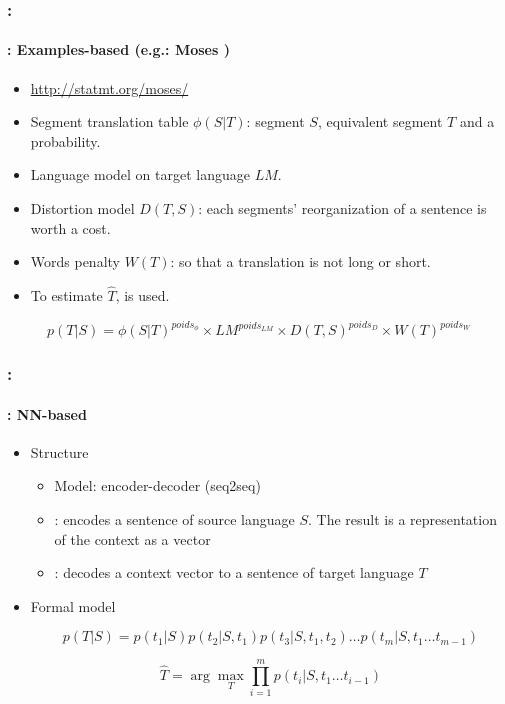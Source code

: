 \documentclass[xcolor=table]{beamer}
\begin{document}
\begin{frame}
	\frametitle{\insertshortsubtitle: \insertsection}
	\framesubtitle{\insertsubsection: Examples-based (e.g.: Moses \cite{07-koehn-al})}
	
	\begin{itemize}
		\item \url{http://statmt.org/moses/}
		\item Segment translation table $\phi(S|T)$: segment $S$, equivalent segment $T$ and a probability.
		\item Language model on target language $LM$.
		\item Distortion model $ D(T, S) $: each segments' reorganization of a sentence is worth a cost.
		\item Words penalty $W(T)$: so that a translation is not long or short.
		\item To estimate $\hat{T}$,  is used.
	\end{itemize}

	\[p(T|S) = \phi(S|T)^{poids_{\phi}} \times LM^{poids_{LM}} \times D(T, S)^{poids_{D}} \times W(T)^{poids_{W}}\]
	
\end{frame}

\begin{frame}
	\frametitle{\insertshortsubtitle: \insertsection}
	\framesubtitle{\insertsubsection: NN-based}
	
	\begin{itemize}
		\item Structure
		\begin{itemize}
			\item Model: encoder-decoder (seq2seq)
			\item {}: encodes a sentence of source language $S$. The result is a representation of the context as a vector
			\item {}: decodes a context vector to a sentence of target language $T$
		\end{itemize}
	
		\item Formal model
		
		\[ p(T|S) = p(t_1|S) p(t_2|S, t_1) p(t_3|S, t_1, t_2)\ldots p(t_m|S, t_1\ldots t_{m-1}) \]
		
		\[\hat{T} = \arg\max_{T} \prod_{i=1}^{m} p(t_i | S, t_1\ldots t_{i-1})\]
	\end{itemize}

\end{frame}
\end{document}
